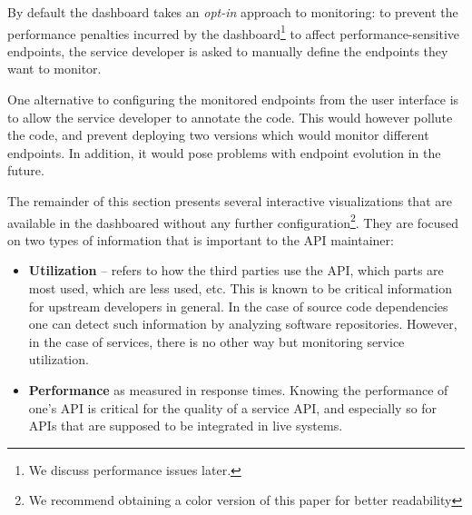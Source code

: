   By default the dashboard takes an {\em opt-in} approach to monitoring: to prevent the performance penalties incurred by the dashboard\footnote{We discuss performance issues later.} to affect performance-sensitive endpoints, the service developer is asked to manually define the endpoints they want to monitor. 
   

  One alternative to configuring the monitored endpoints from the user interface is to allow the service developer to annotate the code. This would however pollute the code, and prevent deploying two versions which would monitor different endpoints. In addition, it would pose problems with endpoint evolution in the future.

  
\niceseparator

  The remainder of this section presents several interactive
  visualizations that are available in the dashboared without any further configuration\footnote{We recommend obtaining a color version of this paper for better readability}. They are focused on two types of information that is important to the API maintainer: 

  \begin{itemize}

    \item {\bf Utilization} -- refers to how the third parties use the API, which parts are most used, which are less used, etc. This is known to be critical information for upstream developers in general\cite{Haen14a}. In the case of source code dependencies one can detect such information by analyzing software repositories. However, in the case of services, there is no other way but monitoring service utilization. 

    \item {\bf Performance} as measured in response times. Knowing the performance of one's API is critical for the quality of a service API, and especially so for APIs that are supposed to be integrated in live systems. 



  \end{itemize}
